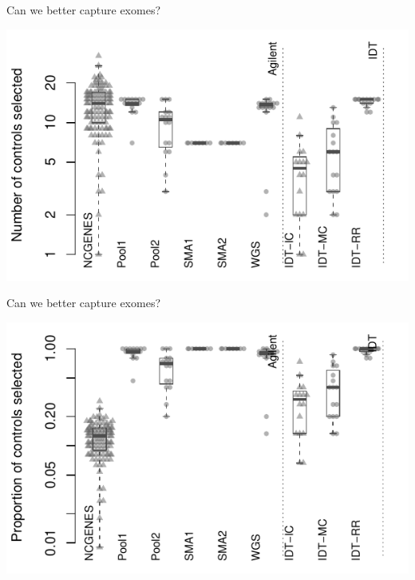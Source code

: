 \documentclass[
  10pt,
  ignorenonframetext,
  m]{beamer}
\begin{document}
\begin{frame}{Can we better capture exomes?}
\protect\hypertarget{can-we-better-capture-exomes-6}{}

\begin{center}\includegraphics{defense_files/figure-beamer/nSelected-1} \end{center}

\end{frame}

\begin{frame}{Can we better capture exomes?}
\protect\hypertarget{can-we-better-capture-exomes-7}{}

\begin{center}\includegraphics{defense_files/figure-beamer/propSelected-1} \end{center}

\end{frame}
\end{document}
